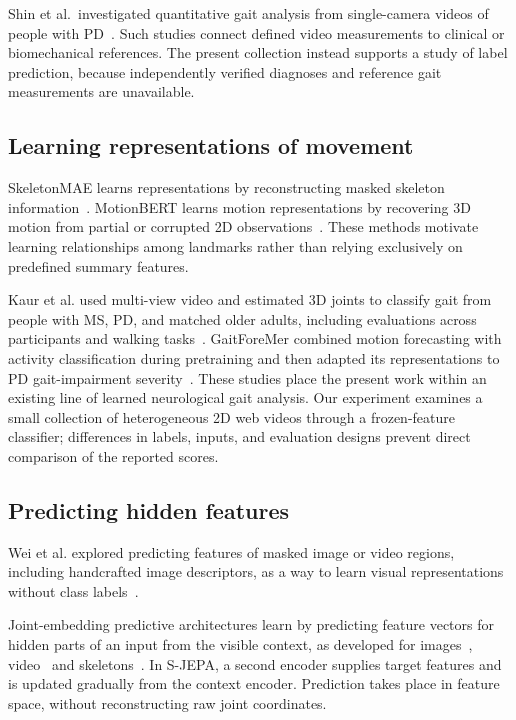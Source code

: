 \documentclass[10pt,twocolumn,letterpaper]{article}
\begin{document}
Shin et al.\ investigated quantitative gait analysis from single-camera videos of people with PD~\cite{shin2021}. Such studies connect defined video measurements to clinical or biomechanical references. The present collection instead supports a study of label prediction, because independently verified diagnoses and reference gait measurements are unavailable.

\subsection{Learning representations of movement}
SkeletonMAE learns representations by reconstructing masked skeleton information~\cite{skeletonmae}. MotionBERT learns motion representations by recovering 3D motion from partial or corrupted 2D observations~\cite{motionbert}. These methods motivate learning relationships among landmarks rather than relying exclusively on predefined summary features.

Kaur et al. used multi-view video and estimated 3D joints to classify gait from people with MS, PD, and matched older adults, including evaluations across participants and walking tasks~\cite{kaur2023}. GaitForeMer combined motion forecasting with activity classification during pretraining and then adapted its representations to PD gait-impairment severity~\cite{gaitforemer}. These studies place the present work within an existing line of learned neurological gait analysis. Our experiment examines a small collection of heterogeneous 2D web videos through a frozen-feature classifier; differences in labels, inputs, and evaluation designs prevent direct comparison of the reported scores.


\subsection{Predicting hidden features}
Wei et al. explored predicting features of masked image or video regions, including handcrafted image descriptors, as a way to learn visual representations without class labels~\cite{maskfeat}.


Joint-embedding predictive architectures learn by predicting feature vectors for hidden parts of an input from the visible context, as developed for images~\cite{ijepa}, video~\cite{vjepa} and skeletons~\cite{sjepa}. In S-JEPA, a second encoder supplies target features and is updated gradually from the context encoder. Prediction takes place in feature space, without reconstructing raw joint coordinates.
\end{document}
